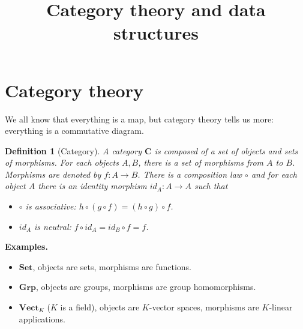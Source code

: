 \documentclass[11pt,a4paper]{article}
\title{Category theory and data structures}
\newtheorem{defi}[theo]{Definition}
\newcommand{\itemz}{\item[$\triangleright$]}
\newcommand{\gr}{\textbf}
\newcommand{\1}{\mathbbm{1}}
\begin{document}
\section{Category theory}
We all know that everything is a map, but category theory tells us more: everything is a commutative diagram.
\begin{defi}[Category]
A category $\gr{C}$ is composed of a set of objects and sets of morphisms. For each objects $A,B$, there is a set of morphisms from $A$ to $B$. Morphisms are denoted by $f : A \to B$. There is a composition law $\circ$ and for each object $A$ there is an identity morphism $id_A : A \to A$ such that
\begin{itemize}
\setlength\itemsep{-0.3em}
\itemz $\circ$ is associative: $h \circ (g \circ f) = (h \circ g) \circ f$.
\itemz $id_A$ is neutral: $f \circ id_A = id_B \circ f = f$.
\end{itemize}
\end{defi}

\begin{center}
\end{center}

\gr{Examples.}
\begin{itemize}
\setlength\itemsep{-0.3em}
\itemz $\gr{Set}$, objects are sets, morphisms are functions.
\itemz $\gr{Grp}$, objects are groups, morphisms are group homomorphisms.
\itemz $\gr{Vect}_K$ ($K$ is a field), objects are $K$-vector spaces, morphisms are $K$-linear applications.
\end{itemize}
\end{document}
